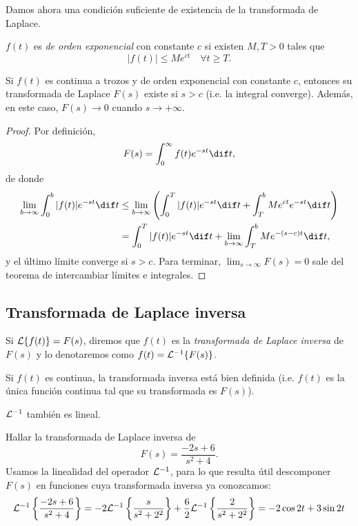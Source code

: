\documentclass[../main.tex]{subfiles}
\begin{document}
Damos ahora una condición suficiente de existencia de la transformada de Laplace.

\begin{definition}
  \(f(t)\) es \emph{de orden exponencial} con constante \(c\) si existen \(M, T
  > 0\) tales que
  \[|f(t)| \leq Me^{ct} \quad \forall t \geq T.\]
\end{definition}

\begin{theorem}
  Si \(f(t)\) es continua a trozos y de orden exponencial con constante \(c\),
  entonces su transformada de Laplace \(F(s)\) existe si \(s > c\) (i.e. la
  integral converge). Además, en este caso, \(F(s) \to 0\) cuando \(s \to +\infty\).
  \begin{proof}
    Por definición,
    \[F(s) = \int_0^\infty f(t)e^{-st} \dif t,\]
    de donde
    \begin{align*}
      \lim_{b \to \infty} \int_0^b |f(t)|e^{-st} \dif t &\leq \lim_{b \to
        \infty} \left( \int_0^T |f(t)|e^{-st} \dif t + \int_T^b Me^{ct}e^{-st}
        \dif t \right) \\
      &= \int_0^T |f(t)|e^{-st} \dif t + \lim_{b \to \infty} \int_T^b Me^{-(s-c)t} \dif t,
    \end{align*}
    y el último límite converge si \(s>c\). Para terminar, \(\lim_{s \to \infty}
    F(s) = 0\) sale del teorema de intercambiar límites e integrales.
  \end{proof}
\end{theorem}

\subsection{Transformada de Laplace inversa}
Si \(\mathcal{L}\{f(t)\} = F(s)\), diremos que \(f(t)\) es la \emph{transformada de
  Laplace inversa} de \(F(s)\) y lo denotaremos como \(f(t) = \mathcal{L}^{-1}\{F(s)\}\).

\begin{remark}
  Si \(f(t)\) es continua, la transformada inversa está bien definida
  (i.e. \(f(t)\) es la única función continua tal que su transformada es \(F(s)\)).
\end{remark}

\begin{remark}
  \(\mathcal{L}^{-1}\) también es lineal.
\end{remark}

\begin{example}
  Hallar la transformada de Laplace inversa de
  \[F(s) = \frac{-2s+6}{s^2+4}.\]
  Usamos la linealidad del operador \(\mathcal{L}^{-1}\), para lo que resulta útil
  descomponer \(F(s)\) en funciones cuya transformada inversa ya conozcamos:
  \[\mathcal{L}^{-1}\left\{\frac{-2s+6}{s^2+4}\right\} =
    -2\mathcal{L}^{-1}\left\{\frac{s}{s^2+2^2}\right\} +
    \frac{6}{2}\mathcal{L}^{-1}\left\{\frac{2}{s^2+2^2}\right\} = -2 \cos 2t + 3 \sin 2t\]
\end{example}
\end{document}
